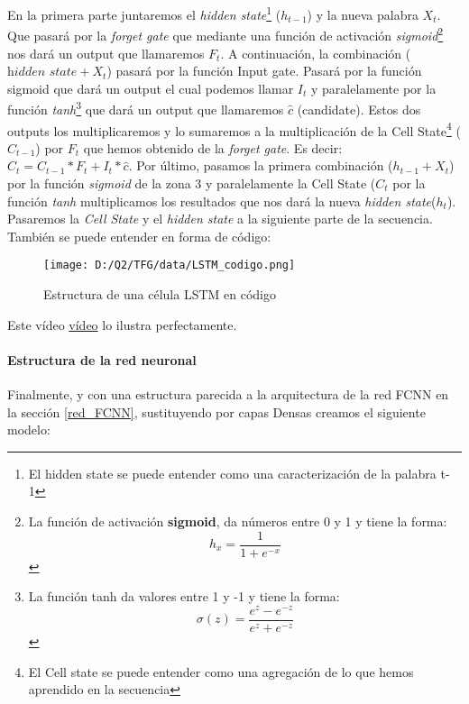 \documentclass[10pt,riqno,a4paper,twoside]{article}\usepackage[]{graphicx}\usepackage[]{color}
\begin{document}
En la primera parte juntaremos el \textit{hidden state}\footnote{El hidden state se puede entender como una caracterización de la palabra t-1} ($h_{t-1}$) y la nueva palabra $X_{t}$. Que pasará por la \textit{forget gate} que mediante una función de activación \textit{sigmoid}\footnote{La función de activación \textbf{sigmoid}, da números entre 0 y 1 y tiene la forma: $$ h_{x} =  \frac{\mathrm{1} }{\mathrm{1} + e^{-x} }  $$} nos dará un output que llamaremos $F_{t}$. A continuación, la combinación ($\textit{hidden state} + X_{t}$) pasará por la función Input gate. Pasará por la función sigmoid que dará un output el cual podemos llamar $I_{t}$ y paralelamente por la función \textit{tanh}\footnote{La función tanh da valores entre 1 y -1 y tiene la forma: $$\sigma(z)=\frac{e^{z}-e^{-z}}{e^{z}+e^{-z}}$$} que dará un output que llamaremos $\hat{c}$ (candidate). Estos dos outputs los multiplicaremos y lo sumaremos a la multiplicación de la Cell State\footnote{El Cell state se puede entender como una agregación de lo que hemos aprendido en la secuencia} ($C_{t-1}$) por $F_{t}$ que hemos obtenido de la \textit{forget gate}. Es decir: $ C_{t} = C_{t-1} * F_{t} + I_{t} * \hat{c} $. Por último, pasamos la primera combinación ($h_{t-1} + X_{t}$) por la función \textit{sigmoid} de la zona 3 y paralelamente la Cell State ($C_{t}$ por la función \textit{tanh} multiplicamos los resultados que nos dará la nueva \textit{hidden state}($h_{t}$). Pasaremos la \textit{Cell State} y el \textit{hidden state} a la siguiente parte de la secuencia. También se puede entender en forma de código:\\


\begin{figure}[h]
  \caption{Estructura de una célula LSTM en código}
\begin{center}
\texttt{[image: D:/Q2/TFG/data/LSTM\_codigo.png]}
\end{center}
\end{figure}


Este vídeo \href{https://www.youtube.com/watch?v=8HyCNIVRbSU}{vídeo} \cite{LSTM_explanation} lo ilustra perfectamente. 


\paragraph{Estructura de la red neuronal}
Finalmente, y con una estructura parecida a la arquitectura de la red FCNN en la sección \ref{red_FCNN}, sustituyendo por capas Densas creamos el siguiente modelo:
\end{document}
